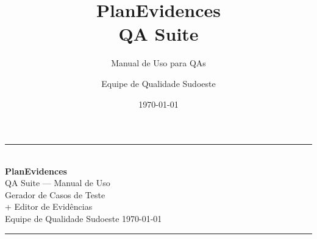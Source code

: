 \documentclass[aspectratio=169,12pt]{beamer}
\title{\Huge\textbf{PlanEvidences}\\[0.3em]\large QA Suite}
\subtitle{\large Manual de Uso para QAs}
\author{Equipe de Qualidade Sudoeste}
\date{\today}
\begin{document}
\begin{frame}[plain]
  \begin{center}
    \vspace{1.5cm}
    {\color{peGreen}\rule{0.6\linewidth}{4pt}}\\[1.2em]
    {\Huge\textbf{\color{peGreen}PlanEvidences}}\\[0.4em]
    {\Large\color{peMuted}QA Suite — Manual de Uso}\\[2em]
    {\large Gerador de Casos de Teste\\ + Editor de Evidências}\\[3em]
    {\small\color{peMuted}Equipe de Qualidade Sudoeste \quad\textbullet\quad \today}\\
    \vspace{0.5cm}
    {\color{peGreen}\rule{0.6\linewidth}{2pt}}
  \end{center}
\end{frame}
\end{document}
